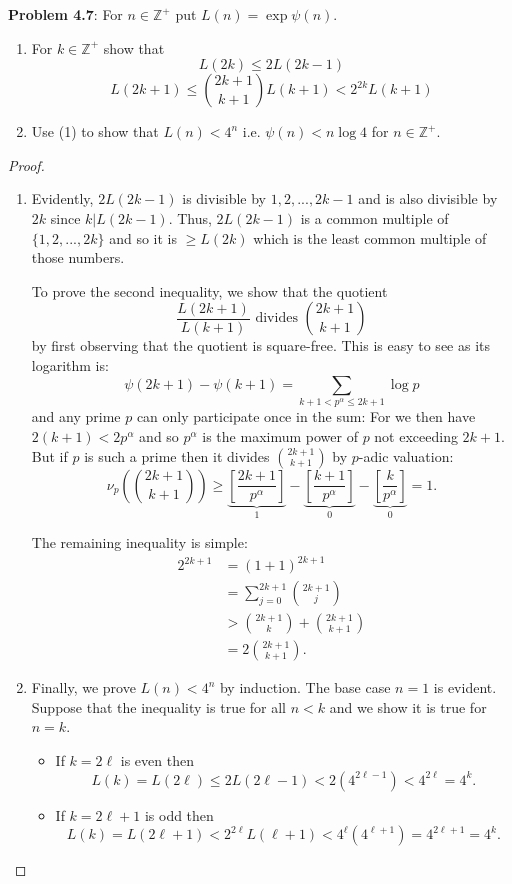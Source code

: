 \documentclass[12pt]{article}
\newcommand{\Z}{\mathbb{Z}}
\newcommand{\IntPart}[1]{\left[ #1 \right]}
\newcommand{\pval}[1]{\nu_p\left( #1 \right)}
\begin{document}
\fi

\textbf{Problem 4.7}: For $n \in \Z^+$ put $L(n) = \exp \psi(n)$.
\begin{enumerate}
\item For $k \in \Z^+$ show that
$$L(2k) \leq 2L(2k-1)$$
$$L(2k+1) \leq \binom{2k+1}{k+1} L(k+1) < 2^{2k} L(k+1)$$
\item Use (1) to show that $L(n) < 4^n$ i.e. $\psi(n) < n \log 4$ for $n \in \Z^+$.
\end{enumerate}

\begin{proof}
\begin{enumerate}
\item Evidently, $2L(2k-1)$ is divisible by $1, 2, ..., 2k - 1$ and is also divisible by $2k$ since $k | L(2k-1)$. Thus, $2L(2k-1)$ is a common multiple of $\{1, 2, ..., 2k\}$ and so it is $\geq L(2k)$ which is the least common multiple of those numbers.

To prove the second inequality, we show that the quotient
$$\frac{L(2k+1)}{L(k+1)} \text{ divides } \binom{2k+1}{k+1}$$
by first observing that the quotient is square-free. This is easy to see as its logarithm is:
$$\psi(2k+1) - \psi(k+1) = \sum_{k + 1 < p^\alpha \leq 2k+1} \log p$$
and any prime $p$ can only participate once in the sum: For we then have $2(k+1) < 2 p^\alpha$ and so $p^\alpha$ is the maximum power of $p$ not exceeding $2k+1$. But if $p$ is such a prime then it divides $\binom{2k+1}{k+1}$ by $p$-adic valuation:
$$\pval{\binom{2k+1}{k+1}} \geq \underbrace{\IntPart{\frac{2k+1}{p^\alpha}}}_{1} - \underbrace{\IntPart{\frac{k+1}{p^\alpha}}}_{0} - \underbrace{\IntPart{\frac{k}{p^\alpha}}}_{0} = 1.$$

The remaining inequality is simple:
\begin{align*}
2^{2k+1} &= (1 + 1)^{2k+1}\\
&= \sum_{j = 0}^{2k+1} \binom{2k + 1}{j}\\
&> \binom{2k+1}{k} + \binom{2k+1}{k+1}\\
&= 2 \binom{2k+1}{k+1}.
\end{align*}

\item Finally, we prove $L(n) < 4^n$ by induction. The base case $n = 1$ is evident. Suppose that the inequality is true for all $n < k$ and we show it is true for $n = k$.
\begin{itemize}
\item If $k = 2 \ell$ is even then
$$L(k) = L(2\ell) \leq 2 L(2\ell - 1) < 2 (4^{2\ell - 1}) < 4^{2\ell} = 4^k.$$
\item If $k = 2 \ell + 1$ is odd then
$$L(k) = L(2\ell+1) < 2^{2\ell} L(\ell + 1) < 4^{\ell} (4^{\ell + 1}) = 4^{2\ell + 1} = 4^k.$$
\end{itemize}
\end{enumerate}
\end{proof}

\unless\ifdefined\IsMainDocument
\end{document}
